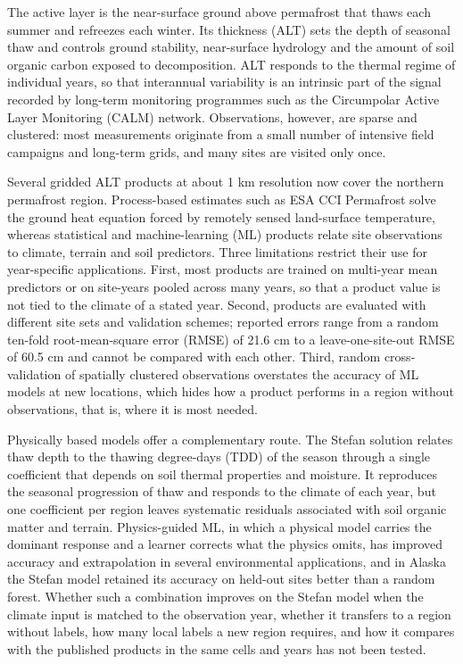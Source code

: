 The active layer is the near-surface ground above permafrost that thaws each summer and refreezes each winter. Its thickness (ALT) sets the depth of seasonal thaw and controls ground stability, near-surface hydrology and the amount of soil organic carbon exposed to decomposition\cite{Hjort2018,Schuur2015,Biskaborn2019}. ALT responds to the thermal regime of individual years, so that interannual variability is an intrinsic part of the signal recorded by long-term monitoring programmes such as the Circumpolar Active Layer Monitoring (CALM) network\cite{Nelson1997,Streletskiy2025}. Observations, however, are sparse and clustered: most measurements originate from a small number of intensive field campaigns and long-term grids, and many sites are visited only once\cite{Moore2025,Veremeeva2025}.

Several gridded ALT products at about 1 km resolution now cover the northern permafrost region. Process-based estimates such as ESA CCI Permafrost solve the ground heat equation forced by remotely sensed land-surface temperature\cite{Westermann2024,Westermann2025}, whereas statistical and machine-learning (ML) products relate site observations to climate, terrain and soil predictors\cite{Aalto2018,Ran2022a,Liu2024,Wei2026}. Three limitations restrict their use for year-specific applications. First, most products are trained on multi-year mean predictors or on site-years pooled across many years, so that a product value is not tied to the climate of a stated year. Second, products are evaluated with different site sets and validation schemes; reported errors range from a random ten-fold root-mean-square error (RMSE) of 21.6 cm\cite{Liu2024} to a leave-one-site-out RMSE of 60.5 cm\cite{Wei2026} and cannot be compared with each other. Third, random cross-validation of spatially clustered observations overstates the accuracy of ML models at new locations\cite{Roberts2017,Ploton2020,MeyerPebesma2022,Wadoux2021}, which hides how a product performs in a region without observations, that is, where it is most needed.

Physically based models offer a complementary route. The Stefan solution relates thaw depth to the thawing degree-days (TDD) of the season through a single coefficient that depends on soil thermal properties and moisture\cite{Stefan1891,Riseborough2008,Nelson1997}. It reproduces the seasonal progression of thaw and responds to the climate of each year, but one coefficient per region leaves systematic residuals associated with soil organic matter and terrain. Physics-guided ML, in which a physical model carries the dominant response and a learner corrects what the physics omits, has improved accuracy and extrapolation in several environmental applications\cite{Willard2022,Read2019,Jia2021}, and in Alaska the Stefan model retained its accuracy on held-out sites better than a random forest\cite{Gautam2025}. Whether such a combination improves on the Stefan model when the climate input is matched to the observation year, whether it transfers to a region without labels, how many local labels a new region requires, and how it compares with the published products in the same cells and years has not been tested.

